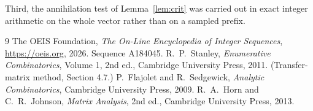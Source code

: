 \documentclass[11pt,a4paper]{article}
\theoremstyle{plain}
\theoremstyle{definition}
\begin{document}
Third, the annihilation test of Lemma~\ref{lem:crit} was carried out in exact integer
arithmetic on the whole vector rather than on a sampled prefix.

\begin{thebibliography}{9}
 The OEIS Foundation, \emph{The On-Line Encyclopedia of Integer
Sequences}, \url{https://oeis.org}, 2026. Sequence A184045.
 R.~P.~Stanley, \emph{Enumerative Combinatorics}, Volume 1, 2nd ed.,
Cambridge University Press, 2011. (Transfer-matrix method, Section 4.7.)
 P.~Flajolet and R.~Sedgewick, \emph{Analytic Combinatorics}, Cambridge
University Press, 2009.
 R.~A.~Horn and C.~R.~Johnson, \emph{Matrix Analysis}, 2nd ed., Cambridge
University Press, 2013.
\end{thebibliography}
\end{document}
